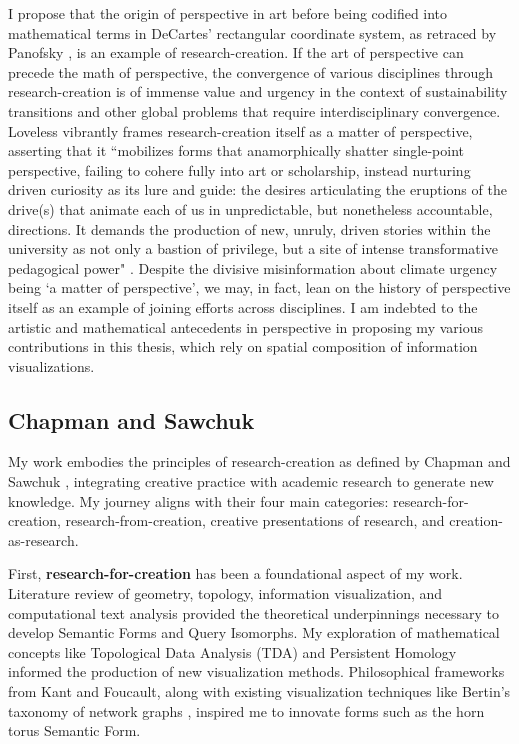 I propose that the origin of perspective in art before being codified into mathematical terms in DeCartes’ rectangular coordinate system, as retraced by Panofsky \citep[p. 57-58]{panofsky_perspective_1991}, is an example of research-creation. If the art of perspective can precede the math of perspective, the convergence of various disciplines through research-creation is of immense value and urgency in the context of sustainability transitions and other global problems that require interdisciplinary convergence. Loveless vibrantly frames research-creation itself as a matter of perspective, asserting that it ``mobilizes forms that anamorphically shatter single-point perspective, failing to cohere fully into art or scholarship, instead nurturing driven curiosity as its lure and guide: the desires articulating the eruptions of the drive(s) that animate each of us in unpredictable, but nonetheless accountable, directions. It demands the production of new, unruly, driven stories within the university as not only a bastion of privilege, but a site of intense transformative pedagogical power" \citep[p. 105]{loveless_how_2019-1}. Despite the divisive misinformation about climate urgency being `a matter of perspective’, we may, in fact, lean on the history of perspective itself as an example of joining efforts across disciplines. I am indebted to the artistic and mathematical antecedents in perspective in proposing my various contributions in this thesis, which rely on spatial composition of information visualizations.

\subsection{Chapman and Sawchuk}
My work embodies the principles of research-creation as defined by Chapman and Sawchuk \citep{chapman_research-creation_2012}, integrating creative practice with academic research to generate new knowledge. My journey aligns with their four main categories: research-for-creation, research-from-creation, creative presentations of research, and creation-as-research.

First, \textbf{research-for-creation} has been a foundational aspect of my work. Literature review of geometry, topology, information visualization, and computational text analysis provided the theoretical underpinnings necessary to develop Semantic Forms and Query Isomorphs. My exploration of mathematical concepts like Topological Data Analysis (TDA) and Persistent Homology informed the production of new visualization methods. Philosophical frameworks from Kant and Foucault, along with existing visualization techniques like Bertin's taxonomy of network graphs \citep[p. 52, 270]{bertin_semiology_2011}, inspired me to innovate forms such as the horn torus Semantic Form.
\noindent{}   

